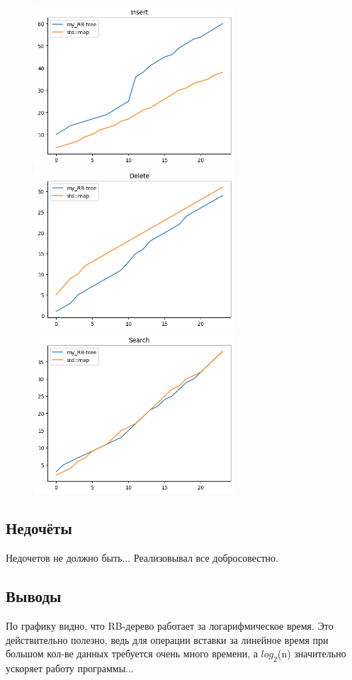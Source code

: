 \documentclass[12pt]{article}
\begin{document}
\begin{figure}[ht!]
    \includegraphics[height=6cm,width=.33\textwidth]{res_speed_add.png}\hfill
    \includegraphics[height=6cm,width=.33\textwidth]{res_speed_del.png}\hfill
    \includegraphics[height=6cm,width=.33\textwidth]{res_speed_search.png}
\end{figure}

\subsection*{Недочёты}

Недочетов не должно быть... Реализовывал все добросовестно.

\subsection*{Выводы}

По графику видно, что RB-дерево работает за логарифмическое время. Это действительно полезно,
ведь для операции вставки за линейное время при большом кол-ве данных требуется очень много 
времени, а $log_2$(n) значительно ускоряет работу программы...
\end{document}
